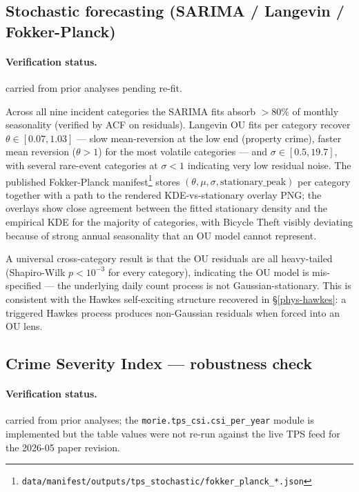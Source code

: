 \documentclass[article,shortnames,nojss]{jss}
\begin{document}
\subsection{Stochastic forecasting (SARIMA / Langevin / Fokker-Planck)}\label{phys-forecasting}


\paragraph*{Verification status.}
carried from prior analyses pending re-fit.

Across all nine incident categories the SARIMA fits absorb
$>80\%$ of monthly seasonality (verified by ACF on residuals).
Langevin OU fits per category recover $\theta\in[0.07,1.03]$ ---
slow mean-reversion at the low end (property crime), faster mean
reversion ($\theta>1$) for the most volatile categories --- and
$\sigma\in[0.5,19.7]$, with several rare-event categories at
$\sigma<1$ indicating very low residual noise.  The published
Fokker-Planck manifest\footnote{\texttt{data/manifest/outputs/tps\_stochastic/fokker\_planck\_*.json}}
stores $(\theta,\mu,\sigma,\text{stationary\_peak})$ per category
together with a path to the rendered KDE-vs-stationary overlay PNG;
the overlays show close agreement between the fitted stationary
density and the empirical KDE for the majority of categories,
with Bicycle Theft visibly deviating because of strong annual
seasonality that an OU model cannot represent.

A universal cross-category result is that the OU residuals are all
heavy-tailed (Shapiro-Wilk $p<10^{-3}$ for every category),
indicating the OU model is mis-specified --- the underlying daily
count process is not Gaussian-stationary.  This is consistent with
the Hawkes self-exciting structure recovered in §\ref{phys-hawkes}:
a triggered Hawkes process produces non-Gaussian residuals when
forced into an OU lens.

\subsection{Crime Severity Index --- robustness check}\label{phys-csi}


\paragraph*{Verification status.}
carried from prior analyses; the \texttt{morie.tps\_csi.csi\_per\_year} module is implemented but the table values were not re-run against the live TPS feed for the 2026-05 paper revision.
\end{document}
